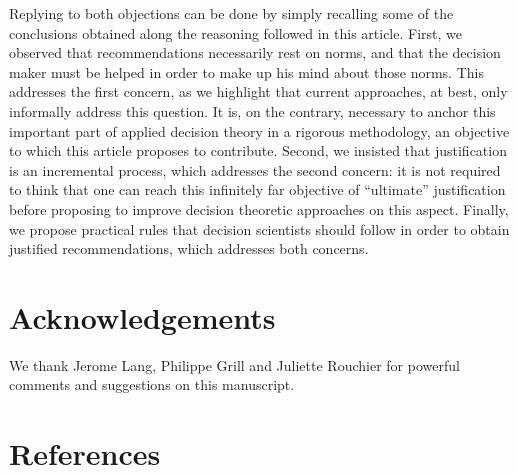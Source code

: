 \documentclass[preprint, french, english, 11pt, authoryear]{elsarticle}%
\begin{document}
Replying to both objections can be done by simply recalling some of the conclusions obtained along the reasoning followed in this article. First, we observed that recommendations necessarily rest on norms, and that the decision maker must be helped in order to make up his mind about those norms. This addresses the first concern, as we highlight that current approaches, at best, only informally address this question. It is, on the contrary, necessary to anchor this important part of applied decision theory in a rigorous methodology, an objective to which this article proposes to contribute. Second, we insisted that justification is an incremental process, which addresses the second concern: it is not required to think that one can reach this infinitely far objective of “ultimate” justification before proposing to improve decision theoretic approaches on this aspect. Finally, we propose practical rules that decision scientists should follow in order to obtain justified recommendations, which addresses both concerns.

\setcounter{secnumdepth}{0}
\section{Acknowledgements}
We thank Jerome Lang, Philippe Grill and Juliette Rouchier for powerful comments and suggestions on this manuscript.

\section{References}

\end{document}
